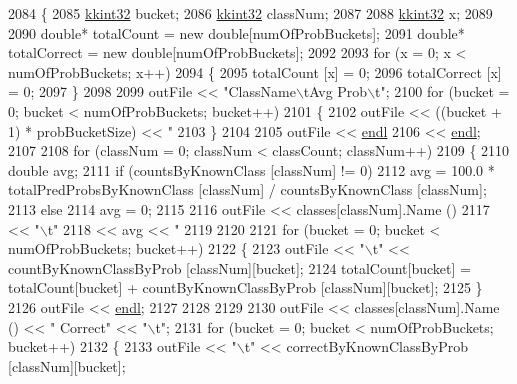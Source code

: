 \begin{DoxyCode}
2084 \{
2085   \hyperlink{namespace_k_k_b_a8fa4952cc84fda1de4bec1fbdd8d5b1b}{kkint32}  bucket;
2086   \hyperlink{namespace_k_k_b_a8fa4952cc84fda1de4bec1fbdd8d5b1b}{kkint32}  classNum;
2087 
2088   \hyperlink{namespace_k_k_b_a8fa4952cc84fda1de4bec1fbdd8d5b1b}{kkint32}  x;
2089 
2090   \textcolor{keywordtype}{double}*  totalCount   = \textcolor{keyword}{new} \textcolor{keywordtype}{double}[numOfProbBuckets];
2091   \textcolor{keywordtype}{double}*  totalCorrect = \textcolor{keyword}{new} \textcolor{keywordtype}{double}[numOfProbBuckets];
2092 
2093   \textcolor{keywordflow}{for}  (x = 0; x < numOfProbBuckets; x++)
2094   \{
2095     totalCount   [x] = 0;
2096     totalCorrect [x] = 0;
2097   \}
2098 
2099   outFile  << \textcolor{stringliteral}{"ClassName\(\backslash\)tAvg Prob\(\backslash\)t"};
2100   \textcolor{keywordflow}{for}  (bucket = 0; bucket < numOfProbBuckets; bucket++)
2101   \{
2102     outFile << ((bucket + 1) * probBucketSize) << \textcolor{stringliteral}{"%
2103   \}
2104 
2105   outFile << \hyperlink{namespace_k_k_b_ad1f50f65af6adc8fa9e6f62d007818a8}{endl}
2106           << \hyperlink{namespace_k_k_b_ad1f50f65af6adc8fa9e6f62d007818a8}{endl};
2107 
2108   \textcolor{keywordflow}{for}  (classNum = 0; classNum < classCount; classNum++)
2109   \{
2110     \textcolor{keywordtype}{double}  avg;
2111     \textcolor{keywordflow}{if}  (countsByKnownClass [classNum] != 0)
2112       avg = 100.0 * totalPredProbsByKnownClass [classNum] / countsByKnownClass [classNum];
2113     \textcolor{keywordflow}{else}
2114       avg = 0;
2115 
2116     outFile << classes[classNum].Name ()
2117             << \textcolor{stringliteral}{"\(\backslash\)t"}
2118             <<  avg << \textcolor{stringliteral}{"%
2119 
2120 
2121     \textcolor{keywordflow}{for}  (bucket = 0; bucket < numOfProbBuckets; bucket++)
2122     \{
2123       outFile << \textcolor{stringliteral}{"\(\backslash\)t"} << countByKnownClassByProb [classNum][bucket];
2124       totalCount[bucket] = totalCount[bucket] + countByKnownClassByProb [classNum][bucket];
2125     \}
2126     outFile << \hyperlink{namespace_k_k_b_ad1f50f65af6adc8fa9e6f62d007818a8}{endl};
2127     
2128 
2129 
2130     outFile << classes[classNum].Name () << \textcolor{stringliteral}{" Correct"} << \textcolor{stringliteral}{"\(\backslash\)t"};
2131     \textcolor{keywordflow}{for}  (bucket = 0; bucket < numOfProbBuckets; bucket++)
2132     \{
2133       outFile << \textcolor{stringliteral}{"\(\backslash\)t"} << correctByKnownClassByProb [classNum][bucket];
}}
\end{DoxyCode}
